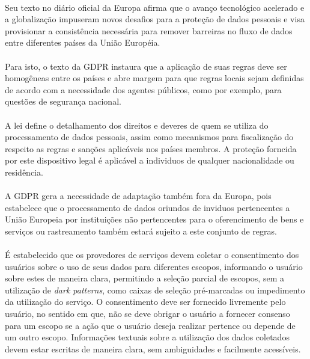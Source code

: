 \paragraph{} Seu texto no diário oficial da Europa afirma que o avanço tecnológico acelerado
e a globalização impuseram novos desafios para a proteção de dados pessoais\cite{eu-2016-679} e visa provisionar a consistência necessária para remover barreiras no fluxo de dados entre diferentes países da União Européia. 

\paragraph{} Para isto, o texto da GDPR instaura que a aplicação de suas regras deve ser homogêneas entre os países e abre margem para que regras locais sejam definidas de acordo com a necessidade dos agentes públicos, como por exemplo, para questões de segurança nacional.

\paragraph{} A lei define o detalhamento dos direitos e deveres de quem se utiliza do processamento de dados pessoais, assim como mecanismos para fiscalização do respeito as regras e sanções aplicáveis nos países membros. A proteção forncida por este dispositivo legal é aplicável a individuos de qualquer nacionalidade ou residência.

\paragraph{} A GDPR gera a necessidade de adaptação também fora da Europa, pois estabelece que o processamento de dados oriundos de inviduos pertencentes a União Europeia por instituições não pertencentes para o oferencimento de bens e serviços ou rastreamento também estará sujeito a este conjunto de regras. 

\paragraph{} É estabelecido que os provedores de serviços devem coletar o consentimento dos usuários sobre o uso de seus dados para diferentes escopos, informando o usuário sobre estes de maneira clara, permitindo a seleção parcial de escopos, sem a utilização de \textit{dark patterns}, como caixas de seleção pré-marcadas ou impedimento da utilização do serviço. O consentimento deve ser fornecido livremente pelo usuário, no sentido em que, não se deve obrigar o usuário a fornecer consenso para um escopo se a ação que o usuário deseja realizar pertence ou depende de um outro escopo. Informações textuais sobre a utilização dos dados coletados devem estar escritas de maneira clara, sem ambiguidades e facilmente acessíveis.

